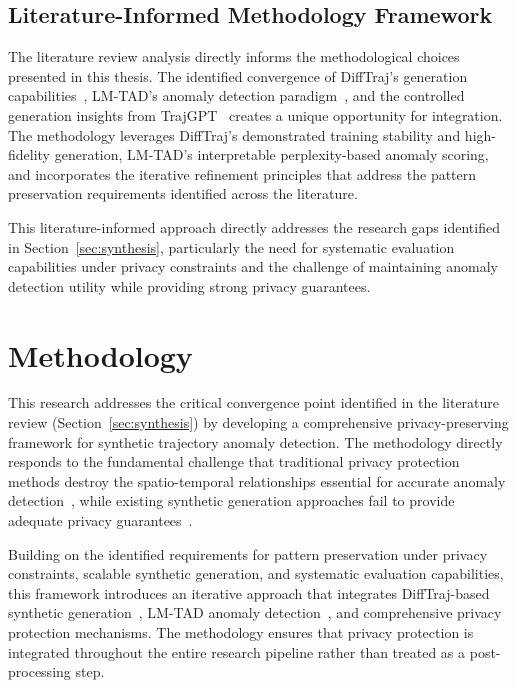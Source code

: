 \documentclass[runningheads]{llncs}
\begin{document}
\subsection{Literature-Informed Methodology Framework}
\label{sec:lit-methodology-bridge}

The literature review analysis directly informs the methodological choices presented in this thesis. The identified convergence of DiffTraj's generation capabilities~\cite{zhuDiffTrajGeneratingGPS2023}, LM-TAD's anomaly detection paradigm~\cite{mbuyaTrajectoryAnomalyDetection2024}, and the controlled generation insights from TrajGPT~\cite{hsuTrajGPTControlledSynthetic2024} creates a unique opportunity for integration. The methodology leverages DiffTraj's demonstrated training stability and high-fidelity generation, LM-TAD's interpretable perplexity-based anomaly scoring, and incorporates the iterative refinement principles that address the pattern preservation requirements identified across the literature.

This literature-informed approach directly addresses the research gaps identified in Section~\ref{sec:synthesis}, particularly the need for systematic evaluation capabilities under privacy constraints and the challenge of maintaining anomaly detection utility while providing strong privacy guarantees.

\section{Methodology}
\label{sec:methodology}

This research addresses the critical convergence point identified in the literature review (Section~\ref{sec:synthesis}) by developing a comprehensive privacy-preserving framework for synthetic trajectory anomaly detection. The methodology directly responds to the fundamental challenge that traditional privacy protection methods destroy the spatio-temporal relationships essential for accurate anomaly detection~\cite{buchholzSystematisationKnowledgeTrajectory2024}, while existing synthetic generation approaches fail to provide adequate privacy guarantees~\cite{liuTrajGANsUsingGenerative2018}.

Building on the identified requirements for pattern preservation under privacy constraints, scalable synthetic generation, and systematic evaluation capabilities, this framework introduces an iterative approach that integrates DiffTraj-based synthetic generation~\cite{zhuDiffTrajGeneratingGPS2023}, LM-TAD anomaly detection~\cite{mbuyaTrajectoryAnomalyDetection2024}, and comprehensive privacy protection mechanisms. The methodology ensures that privacy protection is integrated throughout the entire research pipeline rather than treated as a post-processing step.
\end{document}
